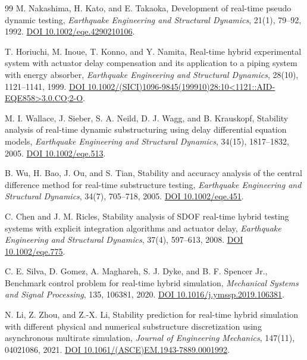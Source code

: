 \documentclass[UTF8,11pt,a4paper]{ctexart}
\begin{document}
\begin{thebibliography}{99}
M. Nakashima, H. Kato, and E. Takaoka, Development of real-time pseudo dynamic testing, \emph{Earthquake Engineering and Structural Dynamics}, 21(1), 79--92, 1992. \href{https://doi.org/10.1002/eqe.4290210106}{DOI 10.1002/eqe.4290210106}.

T. Horiuchi, M. Inoue, T. Konno, and Y. Namita, Real-time hybrid experimental system with actuator delay compensation and its application to a piping system with energy absorber, \emph{Earthquake Engineering and Structural Dynamics}, 28(10), 1121--1141, 1999. \href{https://doi.org/10.1002/(SICI)1096-9845(199910)28:10%3C1121::AID-EQE858%3E3.0.CO;2-O}{DOI 10.1002/(SICI)1096-9845(199910)28:10<1121::AID-EQE858>3.0.CO;2-O}.

M. I. Wallace, J. Sieber, S. A. Neild, D. J. Wagg, and B. Krauskopf, Stability analysis of real-time dynamic substructuring using delay differential equation models, \emph{Earthquake Engineering and Structural Dynamics}, 34(15), 1817--1832, 2005. \href{https://doi.org/10.1002/eqe.513}{DOI 10.1002/eqe.513}.

B. Wu, H. Bao, J. Ou, and S. Tian, Stability and accuracy analysis of the central difference method for real-time substructure testing, \emph{Earthquake Engineering and Structural Dynamics}, 34(7), 705--718, 2005. \href{https://doi.org/10.1002/eqe.451}{DOI 10.1002/eqe.451}.

C. Chen and J. M. Ricles, Stability analysis of SDOF real-time hybrid testing systems with explicit integration algorithms and actuator delay, \emph{Earthquake Engineering and Structural Dynamics}, 37(4), 597--613, 2008. \href{https://doi.org/10.1002/eqe.775}{DOI 10.1002/eqe.775}.

C. E. Silva, D. Gomez, A. Maghareh, S. J. Dyke, and B. F. Spencer Jr., Benchmark control problem for real-time hybrid simulation, \emph{Mechanical Systems and Signal Processing}, 135, 106381, 2020. \href{https://doi.org/10.1016/j.ymssp.2019.106381}{DOI 10.1016/j.ymssp.2019.106381}.

N. Li, Z. Zhou, and Z.-X. Li, Stability prediction for real-time hybrid simulation with different physical and numerical substructure discretization using asynchronous multirate simulation, \emph{Journal of Engineering Mechanics}, 147(11), 04021086, 2021. \href{https://doi.org/10.1061/(ASCE)EM.1943-7889.0001992}{DOI 10.1061/(ASCE)EM.1943-7889.0001992}.


\end{thebibliography}
\end{document}
